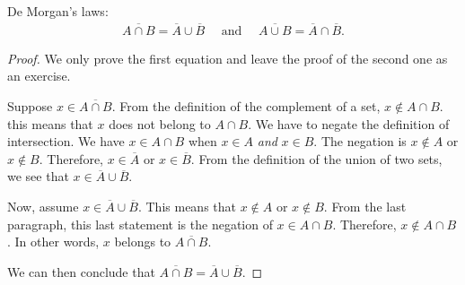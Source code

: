     \begin{theorem}
    De Morgan's laws:
        \begin{align*}
        \overline{A \cap B} = \overline{A} \cup \overline{B} \quad \text{ and } \quad \overline{A \cup B} = \overline{A} \cap \overline{B} .
        \end{align*}
    \end{theorem}
    \begin{proof}
    We only prove the first equation and leave the proof of the second one as an exercise. 

    Suppose $x \in \overline{A \cap B}$. From the definition of the complement of a set, $x \not\in A \cap B$. this means that $x$ does not belong to $A \cap B$. We have to negate the definition of intersection. We have $x \in A \cap B$ when $x \in A$ \textit{and} $x \in B$. The negation is $x \not\in A$ or $x \not\in B$. Therefore, $x \in \overline{A}$ or $x \in \overline{B}$. From the definition of the union of two sets, we see that $x \in \overline{A} \cup \overline{B}$.

    Now, assume $x \in \overline{A} \cup \overline{B}$. This means that $x \not\in A$ or $x \not\in B$. From the last paragraph, this last statement is the negation of $x \in A \cap B$. Therefore, $x \not\in A \cap B$. In other words, $x$ belongs to $\overline{A \cap B}$. 

    We can then conclude that $\overline{A \cap B} = \overline{A} \cup \overline{B}$. 
    \end{proof}

